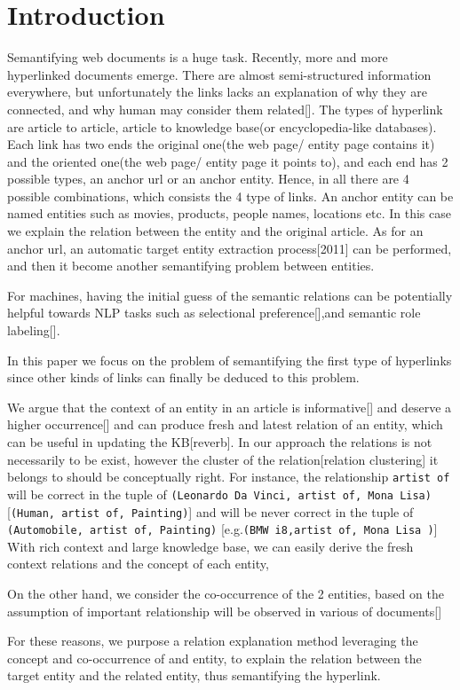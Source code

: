 \section{Introduction}


Semantifying web documents is a huge task. Recently, more and more hyperlinked documents emerge. There are almost semi-structured information everywhere, but unfortunately the links lacks an explanation of why they are connected, and why human may consider them related[]. The types of hyperlink are article to article, article to knowledge base(or encyclopedia-like databases). Each link has two ends the original one(the web page/ entity page contains it) and the oriented one(the web page/ entity page it points to), and each end has 2 possible types, an anchor url or an anchor entity. Hence, in all there are 4 possible combinations, which consists the 4 type of links.
An anchor entity can be named entities such as movies, products, people names, locations etc. In this case we explain the relation between the entity and the original article. As for an anchor url, an automatic target entity extraction process[2011] can be performed, and then it become another semantifying problem between entities.


For machines, having the initial guess of the semantic relations can be potentially helpful towards NLP tasks such as selectional preference[],and semantic role labeling[].


In this paper we focus on the problem of semantifying the first type of hyperlinks since other kinds of links can finally be deduced to this problem.

We argue that the context of an entity in an article is informative[] and deserve a higher occurrence[] and can produce fresh and latest relation of an entity, which can be useful in updating the KB[reverb]. In our approach the relations is not necessarily to be exist, however the cluster of the relation[relation clustering] it belongs to should be conceptually right. For instance, the relationship {\tt artist of} will be correct in the tuple of {\tt(Leonardo Da Vinci, artist of, Mona Lisa)} [{\tt(Human, artist of, Painting)}] and will be never correct in the tuple of {\tt (Automobile, artist of, Painting)} [e.g.{\tt(BMW i8,artist of, Mona Lisa )}]
With rich context and large knowledge base, we can easily derive the fresh context relations and the concept of each entity,

On the other hand, we consider the co-occurrence of the 2 entities, based on the assumption of important relationship will be observed in various of documents[]

For these reasons, we purpose a relation explanation method leveraging the concept and co-occurrence of and entity, to explain the relation between the target entity and the related entity, thus semantifying the hyperlink.
